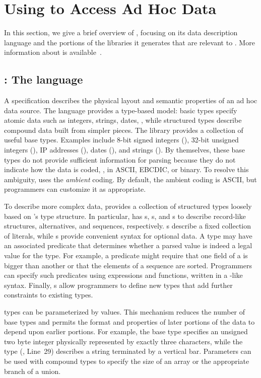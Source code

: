 \section{Using \pads{} to Access Ad Hoc Data}
\label{section:pads}
In this section, we give a brief overview of \pads{}, focusing on its
data description language and the portions of the libraries it generates
that are relevant to \padx{}. More information about \pads{} is
available~\cite{padsmanual,pldi05}.   

\subsection{\pads{}: The language}
\label{subsection:pads-language}
A \pads{} specification describes the physical layout and 
semantic properties of an ad hoc data source. 
The language provides a type-based model:
basic types specify atomic data such as integers, strings, dates, \etc{}, while
structured types describe compound data built from simpler pieces.
The \pads{} library provides a collection of useful base types.
Examples include
8-bit signed integers (),
32-bit unsigned integers (),
IP addresses (), 
dates (), and strings ().
By themselves, these base types do not provide sufficient information for parsing
because they do not indicate how the data is coded, \ie{}, in ASCII, EBCDIC, or binary.  
To resolve this ambiguity, \pads{} uses the \textit{ambient} coding.
By default, the ambient coding is ASCII, but programmers can customize
it as appropriate.

To describe more complex data, \pads{} provides a collection of 
structured types loosely based on \C{}'s type structure.
In particular, \pads{} has 
s, s, and s to describe
record-like structures, alternatives, and sequences, respectively.
s describe a fixed collection of literals, while s 
provide convenient syntax for optional data.
A type may have an associated predicate that determines
whether a parsed value is indeed a legal
value for the type.  For example, a predicate might require that one
field of a  is bigger than another or that the elements
of a sequence are sorted.  Programmers can specify such
predicates using \pads{} expressions and functions, 
written in a \C{}-like syntax.
Finally, \pads{} s allow programmers
to define new types that add further constraints to existing types.

\pads{} types can be parameterized by values.
This mechanism reduces the number of base types and  permits the
format and properties of later portions of the data to depend upon earlier portions.
For example, 
the base type  specifies an unsigned two byte integer
physically represented by exactly three characters, while the type
  (\eg{}, Line~29)
describes a string terminated by a vertical bar.  Parameters can be 
used with compound types to specify the size of an array or the
appropriate branch of a union.

